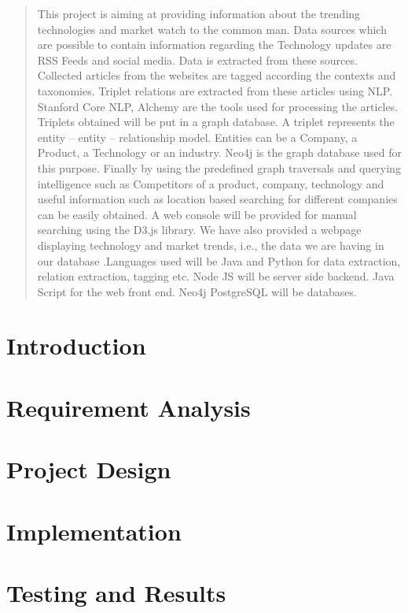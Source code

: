 \documentclass[12pt]{report}
\begin{document}
\begin{abstract}
This project is aiming at providing information about the trending technologies and market watch to the common man. Data sources which are possible to contain information regarding the Technology updates are RSS Feeds and social media. Data is extracted from these sources. Collected articles from the websites are tagged according the contexts and taxonomies. Triplet relations are extracted from these articles using NLP. Stanford Core NLP, Alchemy are the tools used for processing the articles. Triplets obtained will be put in a graph database. A triplet represents the entity – entity – relationship model. Entities can be a Company, a Product, a Technology or an industry. Neo4j is the graph database used for this purpose. Finally by using the predefined graph traversals and querying intelligence such as Competitors of a product, company, technology and useful information such as location based searching for different companies can be easily obtained. A web console will be provided for manual searching using the D3.js library. We have also provided a webpage displaying technology and market trends, i.e., the data we are having in our database .Languages used will be Java and Python for data extraction, relation extraction, tagging etc. Node JS will be server side backend. Java Script for the web front end. Neo4j  PostgreSQL will be databases.
\end{abstract}


\tableofcontents		
	 
 	
	
	
\listoffigures

\chapter{Introduction}



\chapter{Requirement Analysis}


\chapter{Project Design}


\chapter{Implementation}


\chapter{Testing and Results}

\end{document}
